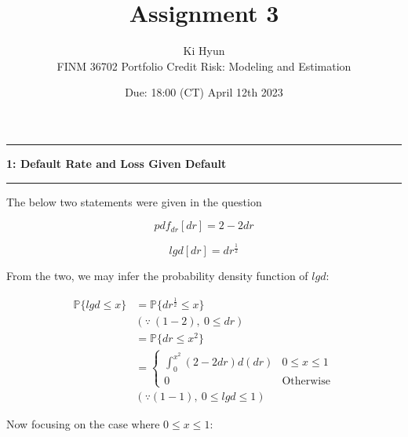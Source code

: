 \documentclass[11pt]{article}
\newcommand\question[2]{\vspace{.25in}\hrule\textbf{#1: #2}\vspace{.5em}\hrule\vspace{.10in}}
\renewcommand\part[1]{\vspace{.10in}\textbf{(#1)}}
\renewcommand{\P}{\mathbb{P}}
\begin{document}
\raggedright


\newcommand\NAME{Ki Hyun}  %
\newcommand\ClassNumber{FINM 36702}
\newcommand\ClassName{Portfolio Credit Risk: Modeling and Estimation}    
\newcommand\ANUM{3}              %
\newcommand\duedate{18:00 (CT) April 12th 2023}	%

\title{Assignment \ANUM}
\author{\NAME \\ 
\ClassNumber \text{:} \ClassName}
\date{Due: \duedate}

\maketitle


\question{1}{Default Rate and Loss Given Default}

The below two statements were given in the question

\begin{equation} \tag{1 - 1}
pdf_{dr}[dr] = 2 - 2dr
\end{equation}

\begin{equation}\tag{1 - 2}
lgd[dr] = dr^{\frac{1}{2}}
\end{equation}

From the two, we may infer the probability density function of $lgd$:

$$
\begin{aligned}
\P\{lgd \leq x\} &=
\P\{dr^{\frac{1}{2}} \leq x\} \\
&(\because \ (1 - 2), \ 0 \leq dr) \\
&= \P\{dr \leq x^2 \} \\
&= \begin{cases} 
\int_0^{x^2} (2 - 2dr) d(dr) & 0 \leq x \leq 1 \\
0 & \text{Otherwise}
\end{cases}
\\
&(\because (1 - 1), \ 0 \leq lgd \leq 1)
\end{aligned}
$$

Now focusing on the case where $0 \leq x \leq 1$:
\end{document}
